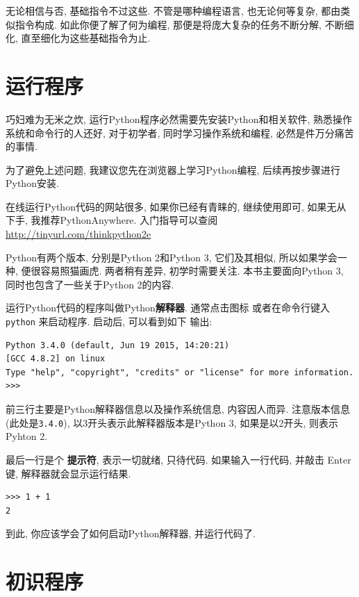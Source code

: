 \documentclass[10pt]{book}
\begin{document}
无论相信与否, 基础指令不过这些. 
不管是哪种编程语言, 
也无论何等复杂, 都由类似指令构成. 
如此你便了解了何为编程, 
那便是将庞大复杂的任务不断分解, 
不断细化, 直至细化为这些基础指令为止. 


\section{运行程序}

巧妇难为无米之炊, 运行Python程序必然需要先安装Python和相关软件, 
熟悉操作系统和命令行的人还好, 对于初学者, 同时学习操作系统和编程, 
必然是件万分痛苦的事情. 

为了避免上述问题, 
我建议您先在浏览器上学习Python编程, 后续再按步骤进行Python安装. 

在线运行Python代码的网站很多, 
如果你已经有青睐的, 继续使用即可,
如果无从下手, 我推荐PythonAnywhere. 
入门指导可以查阅\url{http://tinyurl.com/thinkpython2e}

Python有两个版本, 分别是Python 2和Python 3, 它们及其相似, 
所以如果学会一种, 便很容易照猫画虎. 两者稍有差异, 初学时需要关注. 
本书主要面向Python 3, 同时也包含了一些关于Python 2的内容. 

运行Python代码的程序叫做Python{\bf 解释器}. 通常点击图标
或者在命令行键入{\tt python} 来启动程序. 启动后, 可以看到如下
输出:

\begin{verbatim}
Python 3.4.0 (default, Jun 19 2015, 14:20:21) 
[GCC 4.8.2] on linux
Type "help", "copyright", "credits" or "license" for more information.
>>> 
\end{verbatim}
%

前三行主要是Python解释器信息以及操作系统信息, 内容因人而异. 
注意版本信息(此处是{\tt 3.4.0}), 以3开头表示此解释器版本是Python 3, 
如果是以2开头, 则表示Pyhton 2. 

最后一行是个 {\bf 提示符}, 表示一切就绪, 只待代码. 
如果输入一行代码, 并敲击 Enter键, 解释器就会显示运行结果. 

\begin{verbatim}
>>> 1 + 1
2
\end{verbatim}
%

到此, 你应该学会了如何启动Python解释器, 并运行代码了. 

\section{初识程序}
\label{hello}
\end{document}
